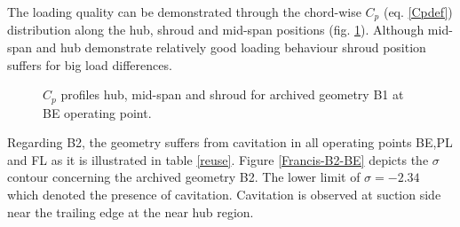 The loading quality can be demonstrated through the chord-wise $C_p$ (eq. \ref{Cpdef}) distribution along the hub, shroud and mid-span positions (fig. \ref{Francis-B1-LOAD}). Although mid-span and hub demonstrate relatively good loading behaviour shroud position suffers for big load differences.      

\begin{figure}[h!]
\begin{minipage}[b]{1\linewidth}
 \centering
\end{minipage}
\caption{$C_p$ profiles hub, mid-span and shroud for archived geometry B1 at BE operating point.}
\label{Francis-B1-LOAD}
\end{figure}

Regarding B2, the geometry suffers from cavitation in all operating points BE,PL and FL as it is illustrated in table \ref{reuse}. Figure \ref{Francis-B2-BE} depicts the $\sigma$ contour concerning the archived geometry B2. The lower limit of $\sigma = -2.34$ which denoted the presence of cavitation. Cavitation is observed at suction side near the trailing edge at the near hub region.     



